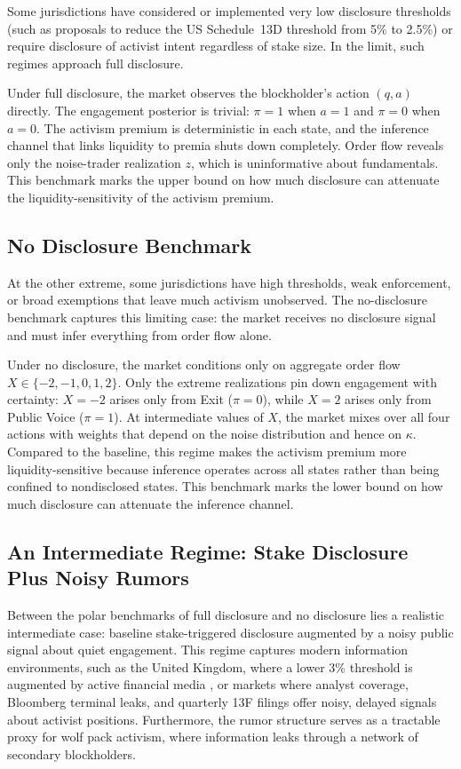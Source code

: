 \documentclass[11pt]{article}
\newcommand{\1}{\mathbf{1}}
\begin{document}
Some jurisdictions have considered or implemented very low disclosure thresholds (such as proposals to reduce the US Schedule~13D threshold from 5\% to 2.5\%) or require disclosure of activist intent regardless of stake size. In the limit, such regimes approach full disclosure.

Under full disclosure, the market observes the blockholder's action $(q,a)$ directly. The engagement posterior is trivial: $\pi=1$ when $a=1$ and $\pi=0$ when $a=0$. The activism premium is deterministic in each state, and the inference channel that links liquidity to premia shuts down completely. Order flow reveals only the noise-trader realization $z$, which is uninformative about fundamentals. This benchmark marks the upper bound on how much disclosure can attenuate the liquidity-sensitivity of the activism premium.

%
\subsection{No Disclosure Benchmark}
%

At the other extreme, some jurisdictions have high thresholds, weak enforcement, or broad exemptions that leave much activism unobserved. The no-disclosure benchmark captures this limiting case: the market receives no disclosure signal and must infer everything from order flow alone.

Under no disclosure, the market conditions only on aggregate order flow $X\in\{-2,-1,0,1,2\}$. Only the extreme realizations pin down engagement with certainty: $X=-2$ arises only from Exit ($\pi=0$), while $X=2$ arises only from Public Voice ($\pi=1$). At intermediate values of $X$, the market mixes over all four actions with weights that depend on the noise distribution and hence on $\kappa$. Compared to the baseline, this regime makes the activism premium more liquidity-sensitive because inference operates across all states rather than being confined to nondisclosed states. This benchmark marks the lower bound on how much disclosure can attenuate the inference channel.

%
\subsection{An Intermediate Regime: Stake Disclosure Plus Noisy Rumors}
\label{sec:noisy_rumors}
%

Between the polar benchmarks of full disclosure and no disclosure lies a realistic intermediate case: baseline stake-triggered disclosure augmented by a noisy public signal about quiet engagement. This regime captures modern information environments, such as the United Kingdom, where a lower 3\% threshold is augmented by active financial media \citep{FangPeress2009}, or markets where analyst coverage, Bloomberg terminal leaks, and quarterly 13F filings offer noisy, delayed signals about activist positions. Furthermore, the rumor structure serves as a tractable proxy for wolf pack activism, where information leaks through a network of secondary blockholders.
\end{document}
